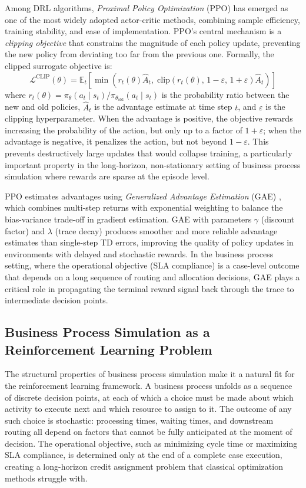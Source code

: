 \documentclass[journal,onecolumn]{IEEEtran}
\begin{document}
Among DRL algorithms, \emph{Proximal Policy Optimization} (PPO)
\cite{schulman2017ppo} has emerged as one of the most widely adopted
actor-critic methods, combining sample efficiency, training stability, and
ease of implementation. PPO's central mechanism is a \emph{clipping
objective} that constrains the magnitude of each policy update, preventing
the new policy from deviating too far from the previous one. Formally, the
clipped surrogate objective is:
\[
\mathcal{L}^{\mathrm{CLIP}}(\theta)
=
\mathbb{E}_t\!\left[
\min\!\left(
r_t(\theta)\hat{A}_t,\;
\mathrm{clip}\!\left(
r_t(\theta),\,1-\varepsilon,\,1+\varepsilon
\right)\hat{A}_t
\right)
\right]
\]
where $r_t(\theta) = \pi_\theta(a_t \mid s_t) / \pi_{\theta_{\mathrm{old}}}
(a_t \mid s_t)$ is the probability ratio between the new and old policies,
$\hat{A}_t$ is the advantage estimate at time step $t$, and $\varepsilon$ is
the clipping hyperparameter. When the advantage is positive, the objective
rewards increasing the probability of the action, but only up to a factor of
$1 + \varepsilon$; when the advantage is negative, it penalizes the action,
but not beyond $1 - \varepsilon$. This prevents destructively large updates
that would collapse training, a particularly important property in the
long-horizon, non-stationary setting of business process simulation where
rewards are sparse at the episode level.

PPO estimates advantages using \emph{Generalized Advantage Estimation} (GAE) \cite{schulman2016gae},
which combines multi-step returns with exponential weighting to balance the
bias-variance trade-off in gradient estimation. GAE with parameters $\gamma$
(discount factor) and $\lambda$ (trace decay) produces smoother and more
reliable advantage estimates than single-step TD errors, improving the
quality of policy updates in environments with delayed and stochastic rewards.
In the business process setting, where the operational objective (SLA
compliance) is a case-level outcome that depends on a long sequence of
routing and allocation decisions, GAE plays a critical role in propagating
the terminal reward signal back through the trace to intermediate decision
points.

\subsection{Business Process Simulation as a Reinforcement Learning Problem}
\label{subsec:bps_as_rl}

The structural properties of business process simulation make it a natural
fit for the reinforcement learning framework. A business process unfolds as
a sequence of discrete decision points, at each of which a choice must be
made about which activity to execute next and which resource to assign to it.
The outcome of any such choice is stochastic: processing times, waiting
times, and downstream routing all depend on factors that cannot be fully
anticipated at the moment of decision. The operational objective, such as
minimizing cycle time or maximizing SLA compliance, is determined only at the
end of a complete case execution, creating a long-horizon credit assignment
problem that classical optimization methods struggle with.
\end{document}
